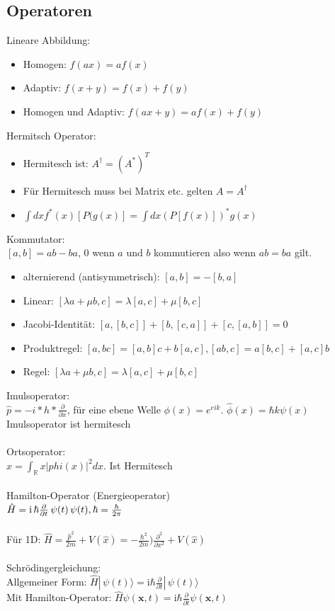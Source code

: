 \documentclass[10pt,a4paper]{article}
\begin{document}
\subsection{Operatoren}
Lineare Abbildung:
\begin{itemize}
\item Homogen: $f(ax) = af(x) $
\item Adaptiv: $f(x+y)= f(x) + f(y)$
\item Homogen und Adaptiv: $f(ax + y) = af(x) + f(y)$ 
\end{itemize}
%
Hermitsch Operator:
\begin{itemize}
\item Hermitesch ist: $A^{\dagger}  = (A^*)^T$
\item Für Hermitesch muss bei Matrix etc. gelten $ A = A^\dagger$
\item $\int dx f^*(x)[P(g(x)]= \int dx (P[f(x)])^*g(x)$
\end{itemize}
%
Kommutator:\\
$[a,b]=ab-ba$, $0$ wenn $a$ und $b$ kommutieren also wenn $ab=ba$ gilt.
\begin{itemize}
\item  alternierend (antisymmetrisch): $[a,b]=-[b,a]$
\item Linear: $ [\lambda a+\mu b,c]=\lambda [a,c] + \mu [b,c]$
\item Jacobi-Identität: $[a,[b,c]]+[b,[c,a]]+[c,[a,b]]=0$
\item Produktregel: $[a,bc] = [a,b]c+b[a,c], [ab,c] = a[b,c]+[a,c]b$
\item Regel: $[\lambda a + \mu b,c] = \lambda [a,c]+\mu [b,c]$
\end{itemize}
%
Imulsoperator:\\
$\hat p = -i*h*\frac{\partial}{\partial x}$, für eine ebene Welle $\phi(x)=e^{eik}$. $\hat\phi(x)=\hbar k \psi(x)$\\
Imulsoperator ist hermitesch\\
%
\\
Ortsoperator:\\
$\hat x =  \int_{\mathbb{R}} x|phi(x)|^2 dx$. Ist Hermitesch\\
%
\\
Hamilton-Operator (Energieoperator)\\
$\hat H = \mathrm i \, \hbar {\partial \over \partial t} \, \psi (t)  \, \psi (t),\hbar = \frac{h}{2\pi}$\\
%
\\
Für 1D: $\hat H = \frac{\hat p^2}{2m}+V(\hat x) = - \frac{{\hbar}^2}{2m})\frac{{\partial}^2}{\partial x^2}+V(\hat x)$\\
%
\\
Schrödingergleichung:\\
Allgemeiner Form: $\hat{H} |\,\psi (t) \rangle = \mathrm{i}\hbar\frac{\partial}{\partial t} |\,\psi (t) \rangle $\\
%
Mit Hamilton-Operator: $\hat H \psi(\mathbf{x},t)=\mathrm{i}\hbar\frac{\partial}{\partial t} \psi(\mathbf{x},t) $
\end{document}
